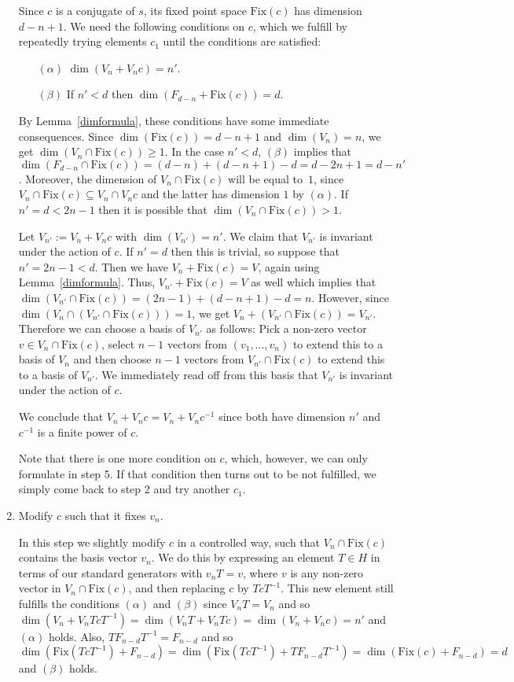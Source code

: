 \documentclass[a4paper,11pt]{article}
\newcommand{\Fix}[1]{\mathrm{Fix}(#1)}
\begin{document}
\begin{enumerate}
Since $c$ is a conjugate of $s$,
its fixed point space $\Fix c$ has dimension $d-n+1$. We need the following
conditions on $c$, which we fulfill by repeatedly trying elements $c_1$
until the conditions are satisfied:
\begin{itemize}
\item[$(\alpha)$] $\dim(V_n + V_n c) = n'$.
\item[$(\beta)$] If $n' < d$ then $\dim(F_{d-n} + \Fix c) = d$.
\end{itemize}
By Lemma~\ref{dimformula}, these conditions have some immediate consequences. 
Since $\dim(\Fix c) =
d-n+1$ and $\dim(V_n) = n$, we get $\dim(V_n \cap \Fix c) \ge
1$. In the case $n' < d$, $(\beta)$ implies that 
$\dim(F_{d-n} \cap \Fix c) = (d-n) + (d-n+1) - d = d-2n+1 = d-n'$. Moreover, 
the dimension of $V_n \cap \Fix c$
will be equal to~$1$, since $V_n \cap \Fix c \subseteq V_n \cap V_n
c$ and the latter has dimension $1$ by $(\alpha)$. 
If $n' = d < 2n-1$ then it is possible that $\dim(V_n \cap \Fix c) >1$.

Let $V_{n'} := V_n + V_n c$ with $\dim(V_{n'})= n'$. We claim that $V_{n'}$ is invariant
under the action of $c$.
If $n'=d$ then this is trivial, so suppose that  $n'=2n-1 < d$.
Then we have $V_n + \Fix c = V$, again using Lemma~\ref{dimformula}.
Thus, $V_{n'} + \Fix c = V$ as well which implies that $\dim(V_{n'} \cap \Fix c)
= (2n-1)+(d-n+1)-d = n$. However, since $\dim(V_n \cap (V_{n'} \cap \Fix c))=1$,
we get $V_n + (V_{n'} \cap \Fix c) = V_{n'}$. Therefore we can choose a basis
of $V_{n'}$ as follows: Pick a non-zero vector $v \in V_n \cap \Fix c$, select
$n-1$ vectors from $(v_1, \ldots, v_n)$ to extend this to a basis
of $V_n$ and then choose $n-1$ vectors from $V_{n'} \cap \Fix c$ to extend this
to a basis of $V_{n'}$. We immediately read off from this basis that $V_{n'}$ is
invariant under the action of $c$.

We conclude that $V_n + V_n c = V_n + V_n c^{-1}$ since both have dimension
$n'$ and $c^{-1}$ is a finite power of $c$.

Note that there is one more condition on $c$, which, however, we can only
formulate in step 5. If that condition then turns out to be not fulfilled,
we simply come back to step 2 and try another $c_1$.

\item Modify $c$ such that it fixes $v_n$.

In this step we slightly modify $c$ in a controlled way, such that
$V_n \cap \Fix c$ contains the basis vector $v_n$. We do this by expressing
an element $T \in H$ in terms of our standard generators with $v_nT
= v$, where $v$ is any non-zero vector in $V_n \cap \Fix c$,
and then replacing $c$ by $Tc T^{-1}$. This new element still fulfills 
the conditions $(\alpha)$ and $(\beta)$ since $V_nT=V_n$ and so 
$\dim(V_n+V_nTcT^{-1})=\dim(V_nT+V_nTc)=\dim(V_n+V_nc)=n'$ and 
$(\alpha)$ holds. Also, $TF_{n-d}T^{-1}=F_{n-d}$ and so $\dim(\Fix {TcT^{-1}} +F_{n-d})
=\dim(\Fix {TcT^{-1}} +TF_{n-d}T^{-1})=\dim(\Fix c +F_{n-d})=d$ and $(\beta)$ holds.


\end{enumerate}
\end{document}
